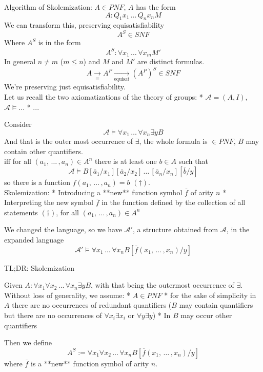 Algorithm of Skolemization: $A \in PNF$, $A$ has the form
$$ A: Q_1 x_1 \, \dots \, Q_n x_n M $$
We can transform this, preserving equisatisfiability
$$ A^S \in SNF $$
Where $A^S$ is in the form
$$ A^S: \forall x_1 \, \dots \, \forall x_m M' $$
In general $n \neq m$ ($m \leq n$) and $M$ and $M'$ are distinct formulas.\\

$$ A \xrightarrow[\equiv]{} A^P \xrightarrow[\text{equisat}]{} (A^P)^S \in SNF $$
We're preserving just equisatisfiability.\\

Let us recall the two axiomatizations of the theory of groups: 
* $\mathcal{A} = (A,I)$, $\mathcal{A} \models ...$ %
* ...

Consider 
$$ \mathcal{A} \models \forall x_1 \, \dots \, \forall x_n \exists y B $$
And that is the outer most occurrence of $\exists$, the whole formula is $\in PNF$, $B$ may contain other quantifiers.\\

iff for all $(a_1, \, \dots \, , a_n) \in A^n$ there is at least one $b \in A$ such that 
$$ \mathcal{A} \models B[\overline a_1/x_1][\overline a_2 / x_2] \, \dots \, [\overline a_n/ x_n] [\overline b / y] $$
so there is a function $f(a_1, \, \dots \, , a_n) = b$ $(\dag)$.\\

Skolemization: 
* Introducing a **new** function symbol $\overline f$ of arity $n$
* Interpreting the new symbol $\overline f$ in the function defined by the collection of all statements $(\dag)$, for all $(a_1, \, \dots \, , a_n) \in A^n$

We changed the language, so we have $\mathcal{A}'$, a structure obtained from $\mathcal{A}$, in the expanded language
$$ \mathcal{A}' \models \forall x_1 \, \dots \, \forall x_n B [\overline f(x_1, \, \dots \, , x_n)/y] $$


TL;DR: Skolemization

Given $A: \forall x_1 \forall x_2 \, \dots \, \forall x_n \exists y B$, with that being the outermost occurrence of $\exists$.\\

Without loss of generality, we assume: 
* $A \in PNF$
* for the sake of simplicity in $A$ there are no occurrences of redundant quantifiers ($B$ may contain quantifiers but there are no occurrences of $\forall x_i \exists x_i$ or $\forall y \exists y$)
* In $B$ may occur other quantifiers 

Then we define 
$$A^S := \forall x_1 \forall x_2 \, \dots \, \forall x_n B[\overline f (x_1, \, \dots \, , x_n) / y] $$
where $\overline f$ is a **new** function symbol of arity $n$.\\

